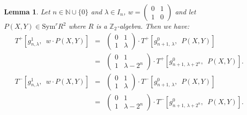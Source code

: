 \documentclass[10pt,a4paper]{amsart}
\newtheorem{lemma}{Lemma}
\newcommand\N{\mathbb{N}}
\newcommand\Sym{{\mathrm {Sym}}}
\newcommand{\Z}{\mathbb{Z}}
\begin{document}
\begin{lemma}\label{T+toT-}
    Let $n \in \N \cup \{0\}$ and $\lambda \in I_{n}$, $w=\left(\begin{smallmatrix}
        0 & 1\\
        1 & 0
    \end{smallmatrix}\right)$ and let $P(X,Y)\in \Sym^rR^2$ where $R$ is a $\Z_{2}$-algebra. Then we have:  \begin{eqnarray}T^+\left[g_{n,\lambda}^{1}, \enspace w \cdot P(X,Y)\right]&=&\left(\begin{smallmatrix}
    0 & 1\\
    1 & \lambda
\end{smallmatrix}\right)\cdot T^+\left[g_{n+1,\,\lambda}^{0},\enspace P(X,Y)\right]
   \label{T+toT-a}\\
   &=&\left(\begin{smallmatrix}
        0 & 1\\
        1 & \lambda -2^n
\end{smallmatrix}\right)\cdot T^+\left[g_{n+1,\, \lambda+2^n}^{0},\enspace P(X,Y)\right].\label{T+toT-b}\\
T^-\left[g_{n,\lambda}^1, \enspace w \cdot P(X,Y)\right] &=& \left(\begin{smallmatrix}
       0&1\\
       1&\lambda
   \end{smallmatrix}\right)\cdot T^-\left[g_{n+1,\,\lambda}^{0}, \enspace P(X,Y)\right]
   \label{T+toT-c}\\
   &=& \left(\begin{smallmatrix}
       0 & 1\\
       1 & \lambda-2^n
   \end{smallmatrix}\right)\cdot T^-\left[g_{n+1,\,\lambda+2^n}^{0},\enspace P(X,Y)\right]. \label{T+toT-d}
  \end{eqnarray} 
    \end{lemma}
\end{document}
